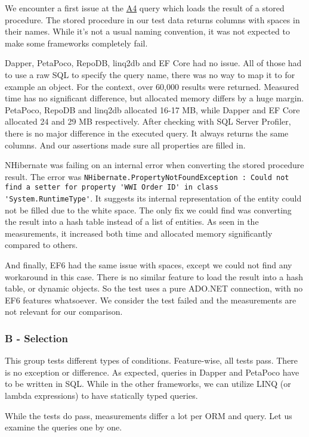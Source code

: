 We encounter a first issue at the \hyperref[query:a4]{A4} query which loads the result of a stored procedure. The stored procedure in our test data returns columns with spaces in their names. While it's not a usual naming convention, it was not expected to make some frameworks completely fail.

Dapper, PetaPoco, RepoDB, linq2db and EF Core had no issue. All of those had to use a raw SQL to specify the query name, there was no way to map it to for example an object. For the context, over 60,000 results were returned. Measured time has no significant difference, but allocated memory differs by a huge margin. PetaPoco, RepoDB and linq2db allocated 16-17 MB, while Dapper and EF Core allocated 24 and 29 MB respectively. After checking with SQL Server Profiler\cite{sqlProfiler}, there is no major difference in the executed query. It always returns the same columns. And our assertions made sure all properties are filled in.

NHibernate was failing on an internal error when converting the stored procedure result.
The error was \lstinline{NHibernate.PropertyNotFoundException : Could not find a setter for property 'WWI Order ID' in class 'System.RuntimeType'}.
It suggests its internal representation of the entity could not be filled due to the white space. The only fix we could find was converting the result into a hash table instead of a list of entities. As seen in the measurements, it increased both time and allocated memory significantly compared to others.

And finally, EF6 had the same issue with spaces, except we could not find any workaround in this case. There is no similar feature to load the result into a hash table, or dynamic objects. So the test uses a pure ADO.NET connection, with no EF6 features whatsoever. We consider the test failed and the measurements are not relevant for our comparison.

\subsubsection{B - Selection}
This group tests different types of conditions. Feature-wise, all tests pass. There is no exception or difference. As expected, queries in Dapper and PetaPoco have to be written in SQL. While in the other frameworks, we can utilize LINQ (or lambda expressions) to have statically typed queries. 

While the tests do pass, measurements differ a lot per ORM and query. Let us examine the queries one by one.

